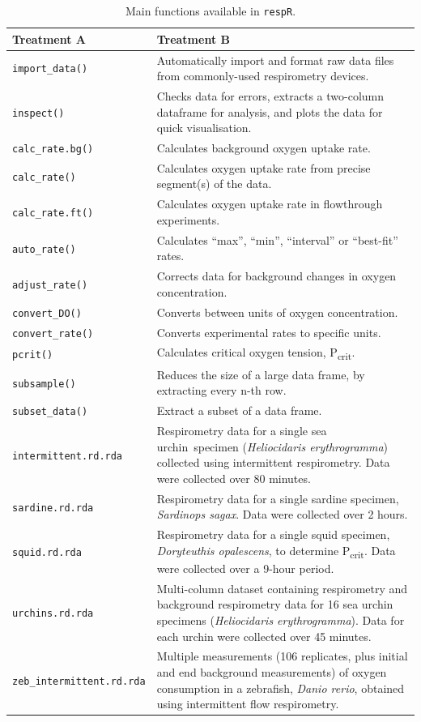 \documentclass[a4paper,10pt, oneside]{memoir}
\begin{document}
\begin{table}[ht]
\centering
\caption{Main functions available in \texttt{respR}.}
\label{funlist}
\begin{tabular}[t]{p{0.3\linewidth}p{0.7\linewidth}}
\toprule
Treatment A&Treatment B\\
\midrule
\texttt{import\_data()} & Automatically import and format raw data files from commonly-used respirometry devices. \\
\texttt{inspect()} & Checks data for errors, extracts a two-column dataframe for analysis, and plots the data for quick visualisation. \\
\texttt{calc\_rate.bg()} & Calculates background oxygen uptake rate. \\
\texttt{calc\_rate()} & Calculates oxygen uptake rate from precise segment(s) of the data. \\
\texttt{calc\_rate.ft()} & Calculates oxygen uptake rate in flowthrough experiments. \\
\texttt{auto\_rate()} & Calculates ``max'', ``min'', ``interval'' or ``best-fit'' rates. \\
\texttt{adjust\_rate()} & Corrects data for background changes in oxygen concentration. \\
\texttt{convert\_DO()} & Converts between units of oxygen concentration. \\
\texttt{convert\_rate()} & Converts experimental rates to specific units. \\
\texttt{pcrit()} & Calculates critical oxygen tension, P\textsubscript{crit}. \\
\texttt{subsample()} & Reduces the size of a large data frame, by extracting every n-th row. \\
\texttt{subset\_data()} & Extract a subset of a data frame. \\
\texttt{intermittent.rd.rda} & Respirometry data for a single sea urchin~specimen (\textit{Heliocidaris erythrogramma}) collected using intermittent respirometry. Data were collected over 80 minutes. \\
\texttt{sardine.rd.rda} & Respirometry data for a single sardine specimen, \textit{Sardinops sagax}. Data were collected over 2 hours. \\
\texttt{squid.rd.rda} & Respirometry data for a single squid specimen, \textit{Doryteuthis opalescens}, to determine P\textsubscript{crit}. Data were collected over a 9-hour period. \\
\texttt{urchins.rd.rda} & Multi-column dataset containing respirometry and background respirometry data for 16 sea urchin specimens (\textit{Heliocidaris erythrogramma}). Data for each urchin were collected over 45 minutes. \\
\texttt{zeb\_intermittent.rd.rda} & Multiple measurements (106 replicates, plus initial and end background measurements) of oxygen consumption in a zebrafish, \textit{Danio rerio}, obtained using intermittent flow respirometry. \\
\bottomrule
\end{tabular}
\end{table}
\end{document}
